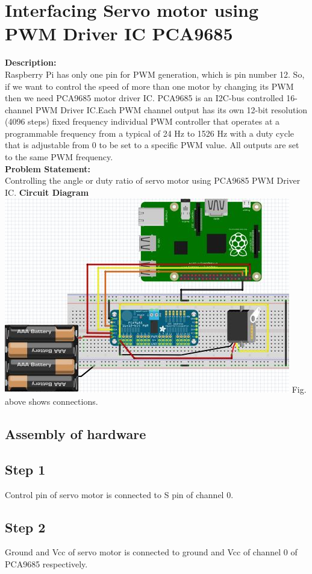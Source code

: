 \documentclass[a4paper,12pt,oneside]{book}
\begin{document}
\section{Interfacing Servo motor using PWM Driver IC PCA9685}
\textbf{Description:} \\
Raspberry Pi has only one pin for PWM generation, which is pin number 12. So, if 
we want to control the speed of more than one motor by changing its PWM then we 
need PCA9685 motor driver IC.
PCA9685 is an I2C-bus controlled 16-channel PWM Driver IC.Each PWM channel output 
has its own 12-bit resolution (4096 steps) fixed frequency individual PWM 
controller that operates at a programmable frequency from a typical of 24 Hz 
to 1526 Hz with a duty cycle that is adjustable from 0%
to be set to a specific PWM value. All outputs are set to the same PWM frequency.\\
\textbf{Problem Statement:} \\
Controlling the angle or duty ratio of servo motor using PCA9685 PWM Driver IC.
\newpage
\textbf{Circuit Diagram}\\
\centering 
\includegraphics[scale=0.6]{servo_motor_PCA9685}
\flushleft
Fig. above shows connections.
\subsection*{Assembly of hardware}
\subsection*{Step 1}
Control pin of servo motor is connected to S pin of channel 0.
\subsection*{Step 2}
Ground and Vcc of servo motor is connected to ground and Vcc of channel 0 of PCA9685 respectively. 
\end{document}
